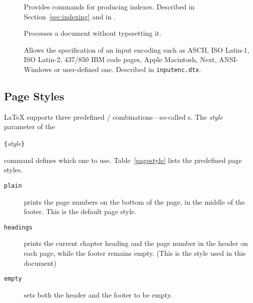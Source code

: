 \begin{table}[btp]
\begin{lined}{\textwidth}
\begin{description}
      \item[\normalfont{}] Provides commands for producing
        indexes.  Described in Section~\ref{sec:indexing} and in \companion.

      \item[\normalfont{}] Processes a document without
        typesetting it.

      \item[\normalfont{}] Allows the specification of an
        input encoding such as ASCII, ISO Latin-1, ISO Latin-2, 437/850 IBM
        code pages,  Apple Macintosh, Next, ANSI-Windows or user-defined one.
        Described in \texttt{inputenc.dtx}.
    \end{description}
  \end{lined}
\end{table}


\subsection{Page Styles}

\LaTeX{} supports three predefined /
combinations---so-called s. The \emph{style} parameter
of the
\begin{lscommand}
  \verb|{|\emph{style}\verb|}|
\end{lscommand}
\noindent command defines which one to use.
Table~\ref{pagestyle}
lists the predefined page styles.

\begin{table}[!hbp]
  \caption{The Predefined Page Styles of \LaTeX.}\label{pagestyle}
  \begin{lined}{\textwidth}
    \begin{description}

      \item[\normalfont\texttt{plain}] prints the page numbers on the bottom
        of the page, in the middle of the footer. This is the default page
        style.

      \item[\normalfont\texttt{headings}] prints the current chapter heading
        and the page number in the header on each page, while the footer
        remains empty.  (This is the style used in this document)
      \item[\normalfont\texttt{empty}] sets both the header and the footer
        to be empty.

    \end{description}
  \end{lined}
\end{table}

